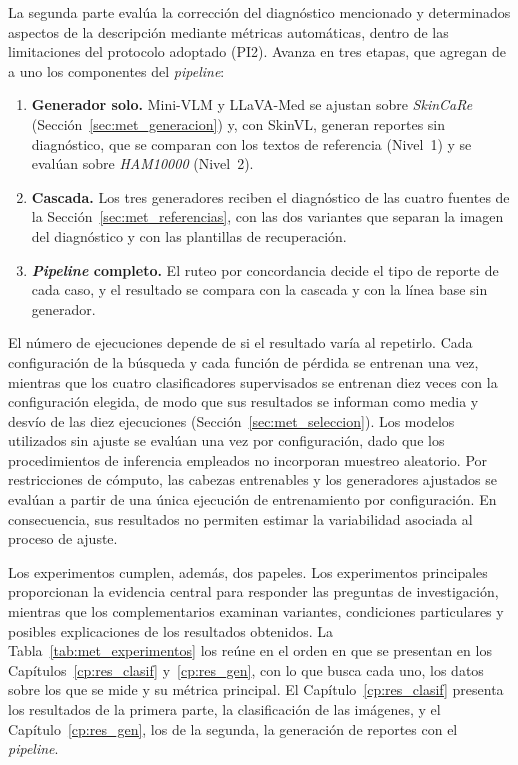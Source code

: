 La segunda parte evalúa la corrección del diagnóstico mencionado y determinados aspectos de la descripción mediante métricas automáticas, dentro de las limitaciones del protocolo adoptado (PI2). Avanza en tres etapas, que agregan de a uno los componentes del \emph{pipeline}:
\begin{enumerate}[leftmargin=1.6em]
    \item \textbf{Generador solo.} Mini-VLM y LLaVA-Med se ajustan sobre \emph{SkinCaRe}
    (Sección~\ref{sec:met_generacion}) y, con SkinVL, generan reportes sin diagnóstico, que se comparan con los textos
    de referencia (Nivel~1) y se evalúan sobre \emph{HAM10000} (Nivel~2).
    \item \textbf{Cascada.} Los tres generadores reciben el diagnóstico de las cuatro fuentes de la
    Sección~\ref{sec:met_referencias}, con las dos variantes que separan la imagen del diagnóstico y con las plantillas
    de recuperación.
    \item \textbf{\emph{Pipeline} completo.} El ruteo por concordancia decide el tipo de reporte de cada caso, y el
    resultado se compara con la cascada y con la línea base sin generador.
\end{enumerate}

El número de ejecuciones depende de si el resultado varía al repetirlo. Cada configuración de la búsqueda y cada
función de pérdida se entrenan una vez, mientras que los cuatro clasificadores supervisados se entrenan diez veces con la configuración elegida, de modo que sus resultados se informan como media y desvío de las diez ejecuciones
(Sección~\ref{sec:met_seleccion}). Los modelos utilizados sin ajuste se evalúan una vez por configuración, dado que los procedimientos de inferencia empleados no incorporan muestreo aleatorio. Por restricciones de cómputo, las cabezas entrenables y los generadores ajustados se evalúan a partir de una única ejecución de entrenamiento por configuración. En consecuencia, sus resultados no permiten estimar la variabilidad asociada al proceso de ajuste.

Los experimentos cumplen, además, dos papeles. Los experimentos principales proporcionan la evidencia central para responder las preguntas de investigación, mientras que los complementarios examinan variantes, condiciones particulares y posibles explicaciones de los resultados obtenidos. La
Tabla~\ref{tab:met_experimentos} los reúne en el orden en que se presentan en los Capítulos~\ref{cp:res_clasif}
y~\ref{cp:res_gen}, con lo que busca cada uno, los datos sobre los que se mide y su métrica principal. El
Capítulo~\ref{cp:res_clasif} presenta los resultados de la primera parte, la clasificación de las imágenes, y el
Capítulo~\ref{cp:res_gen}, los de la segunda, la generación de reportes con el \emph{pipeline}.


